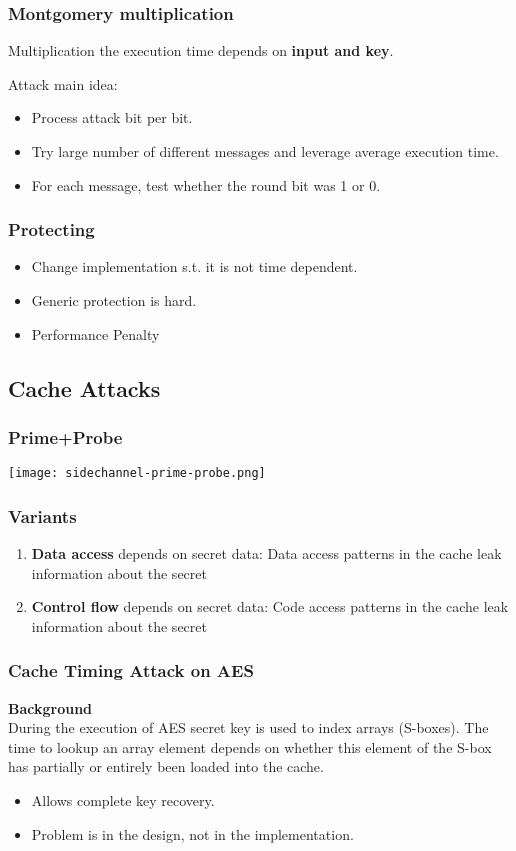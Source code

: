 \subsubsection{Montgomery multiplication}
Multiplication the execution time depends on \textbf{input and key}.

Attack main idea:
\begin{itemize}
  \item Process attack bit per bit.
  \item Try large number of different messages and leverage average execution
    time.
  \item For each message, test whether the round bit was 1 or 0.
\end{itemize}

\subsubsection{Protecting}
\begin{itemize}
  \item Change implementation s.t. it is not time dependent.
  \item Generic protection is hard.
  \item Performance Penalty
\end{itemize}


\subsection{Cache Attacks}
\subsubsection{Prime+Probe}
\texttt{[image: sidechannel-prime-probe.png]}
\subsubsection{Variants}
\begin{enumerate}
  \item \textbf{Data access} depends on secret data: Data access patterns
    in the cache leak information about the secret
  \item \textbf{Control flow} depends on secret data: Code access
    patterns in the cache leak information about the secret
\end{enumerate}
\subsubsection{Cache Timing Attack on AES}
\textbf{Background}\\
During the execution of AES secret key is used to
index arrays (S-boxes). The time to lookup an array element depends
on whether this element of the S-box has partially or entirely been loaded into the
cache.
\begin{itemize}
	\item Allows complete key recovery.
	\item Problem is in the design, not in the implementation.
\end{itemize}

